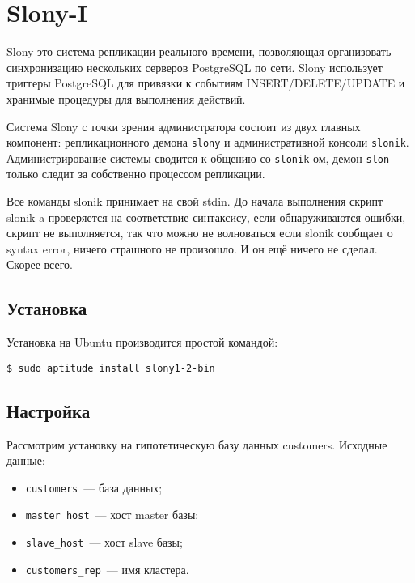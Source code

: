 \section{Slony-I}
\label{sec:slonyI}

Slony это система репликации реального времени, позволяющая организовать синхронизацию нескольких серверов PostgreSQL по сети. Slony использует триггеры PostgreSQL для привязки к событиям INSERT/DELETE/UPDATE и хранимые процедуры для выполнения действий.

Система Slony с точки зрения администратора состоит из двух главных компонент: репликационного демона \lstinline!slony! и административной консоли \lstinline!slonik!. Администрирование системы сводится к общению со \lstinline!slonik!-ом, демон \lstinline!slon! только следит за собственно процессом репликации.

Все команды slonik принимает на свой stdin. До начала выполнения скрипт slonik-a проверяется на соответствие синтаксису, если обнаруживаются ошибки, скрипт не выполняется, так что можно не волноваться если slonik сообщает о syntax error, ничего страшного не произошло. И он ещё ничего не сделал. Скорее всего.

\subsection{Установка}

Установка на Ubuntu производится простой командой:

\begin{lstlisting}[label=lst:slony1,caption=Установка]
$ sudo aptitude install slony1-2-bin
\end{lstlisting}

\subsection{Настройка}
\label{subsec:slonyI-settings}

Рассмотрим установку на гипотетическую базу данных customers. Исходные данные:

\begin{itemize}
  \item \lstinline!customers!~--- база данных;
  \item \lstinline!master_host!~--- хост master базы;
  \item \lstinline!slave_host!~--- хост slave базы;
  \item \lstinline!customers_rep!~--- имя кластера.
\end{itemize}

